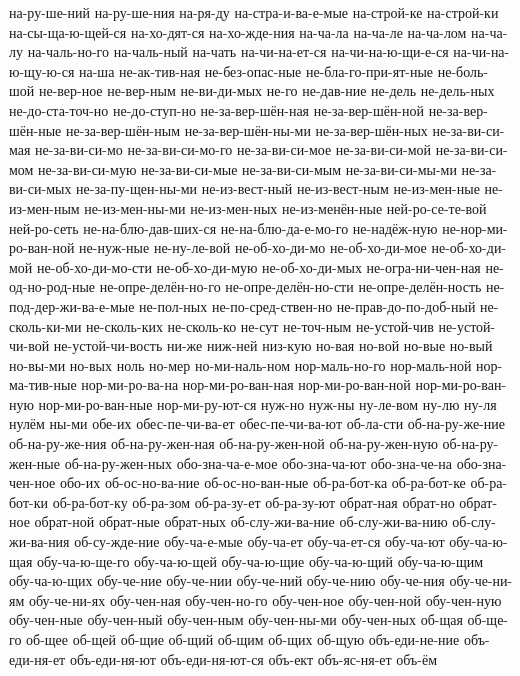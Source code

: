 {на-ру-ше-ний
на-ру-ше-ния
на-ря-ду
на-стра-и-ва-е-мые
на-строй-ке
на-строй-ки
на-сы-ща-ю-щей-ся
на-хо-дят-ся
на-хо-жде-ния
на-ча-ла
на-ча-ле
на-ча-лом
на-ча-лу
на-чаль-но-го
на-чаль-ный
на-чать
на-чи-на-ет-ся
на-чи-на-ю-щи-е-ся
на-чи-на-ю-щу-ю-ся
на-ша
не-ак-тив-ная
не-без-опас-ные
не-бла-го-при-ят-ные
не-боль-шой
не-вер-ное
не-вер-ным
не-ви-ди-мых
не-го
не-дав-ние
не-дель
не-дель-ных
не-до-ста-точ-но
не-до-ступ-но
не-за-вер-шён-ная
не-за-вер-шён-ной
не-за-вер-шён-ные
не-за-вер-шён-ным
не-за-вер-шён-ны-ми
не-за-вер-шён-ных
не-за-ви-си-мая
не-за-ви-си-мо
не-за-ви-си-мо-го
не-за-ви-си-мое
не-за-ви-си-мой
не-за-ви-си-мом
не-за-ви-си-мую
не-за-ви-си-мые
не-за-ви-си-мым
не-за-ви-си-мы-ми
не-за-ви-си-мых
не-за-пу-щен-ны-ми
не-из-вест-ный
не-из-вест-ным
не-из-мен-ные
не-из-мен-ным
не-из-мен-ны-ми
не-из-мен-ных
не-из-менён-ные
ней-ро-се-те-вой
ней-ро-сеть
не-на-блю-дав-ших-ся
не-на-блю-да-е-мо-го
не-надёж-ную
не-нор-ми-ро-ван-ной
не-нуж-ные
не-ну-ле-вой
не-об-хо-ди-мо
не-об-хо-ди-мое
не-об-хо-ди-мой
не-об-хо-ди-мо-сти
не-об-хо-ди-мую
не-об-хо-ди-мых
не-огра-ни-чен-ная
не-од-но-род-ные
не-опре-делён-но-го
не-опре-делён-но-сти
не-опре-делён-ность
не-под-дер-жи-ва-е-мые
не-пол-ных
не-по-сред-ствен-но
не-прав-до-по-доб-ный
не-сколь-ки-ми
не-сколь-ких
не-сколь-ко
не-сут
не-точ-ным
не-устой-чив
не-устой-чи-вой
не-устой-чи-вость
ни-же
ниж-ней
низ-кую
но-вая
но-вой
но-вые
но-вый
но-вы-ми
но-вых
ноль
но-мер
но-ми-наль-ном
нор-маль-но-го
нор-маль-ной
нор-ма-тив-ные
нор-ми-ро-ва-на
нор-ми-ро-ван-ная
нор-ми-ро-ван-ной
нор-ми-ро-ван-ную
нор-ми-ро-ван-ные
нор-ми-ру-ют-ся
нуж-но
нуж-ны
ну-ле-вом
ну-лю
ну-ля
нулём
ны-ми
обе-их
обес-пе-чи-ва-ет
обес-пе-чи-ва-ют
об-ла-сти
об-на-ру-же-ние
об-на-ру-же-ния
об-на-ру-жен-ная
об-на-ру-жен-ной
об-на-ру-жен-ную
об-на-ру-жен-ные
об-на-ру-жен-ных
обо-зна-ча-е-мое
обо-зна-ча-ют
обо-зна-че-на
обо-зна-чен-ное
обо-их
об-ос-но-ва-ние
об-ос-но-ван-ные
об-ра-бот-ка
об-ра-бот-ке
об-ра-бот-ки
об-ра-бот-ку
об-ра-зом
об-ра-зу-ет
об-ра-зу-ют
обрат-ная
обрат-но
обрат-ное
обрат-ной
обрат-ные
обрат-ных
об-слу-жи-ва-ние
об-слу-жи-ва-нию
об-слу-жи-ва-ния
об-су-жде-ние
обу-ча-е-мые
обу-ча-ет
обу-ча-ет-ся
обу-ча-ют
обу-ча-ю-щая
обу-ча-ю-ще-го
обу-ча-ю-щей
обу-ча-ю-щие
обу-ча-ю-щий
обу-ча-ю-щим
обу-ча-ю-щих
обу-че-ние
обу-че-нии
обу-че-ний
обу-че-нию
обу-че-ния
обу-че-ни-ям
обу-че-ни-ях
обу-чен-ная
обу-чен-но-го
обу-чен-ное
обу-чен-ной
обу-чен-ную
обу-чен-ные
обу-чен-ный
обу-чен-ным
обу-чен-ны-ми
обу-чен-ных
об-щая
об-ще-го
об-щее
об-щей
об-щие
об-щий
об-щим
об-щих
об-щую
объ-еди-не-ние
объ-еди-ня-ет
объ-еди-ня-ют
объ-еди-ня-ют-ся
объ-ект
объ-яс-ня-ет
объ-ём
}
